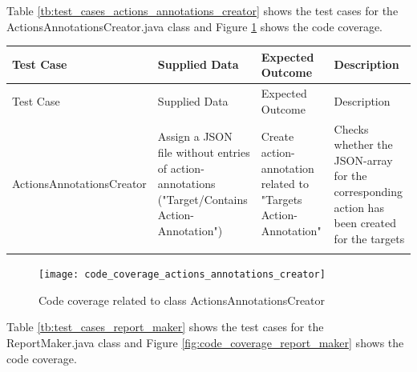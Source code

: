 Table \ref{tb:test_cases_actions_annotations_creator} shows the test cases for the ActionsAnnotationsCreator.java class and Figure \ref{fig:code_coverage_actions_annotations_creator} shows the code coverage.

\thispagestyle{empty}
	\begingroup
	\centering
	\scriptsize
	\renewcommand{\arraystretch}{1,5} 
	\keepXColumns
	\begin{tabularx}{\textwidth}{X  X  X  X}		
		\hline
		Test Case &Supplied Data&Expected Outcome&Description\\
		\hline\hline
		\endfirsthead
		\hline
		Test Case &Supplied Data&Expected Outcome&Description\\
		\hline\hline
		\endhead
		ActionsAnnotationsCreator&Assign a JSON file without entries of action-annotations ("Target/Contains Action-Annotation")&Create action-annotation related to "Targets Action-Annotation"&Checks whether the JSON-array for the corresponding action has been created for the targets\\
		
		
		\hline
		\caption{Test cases for ActionsAnnotationsCreator class}\label{tb:test_cases_actions_annotations_creator}
	\end{tabularx}		
	\endgroup
	
	\begin{figure}[h]
		\centering
		\texttt{[image: code\_coverage\_actions\_annotations\_creator]}
		\caption{Code coverage related to class ActionsAnnotationsCreator}\label{fig:code_coverage_actions_annotations_creator}
	\end{figure} 
	
Table \ref{tb:test_cases_report_maker} shows the test cases for the ReportMaker.java class and Figure \ref{fig:code_coverage_report_maker} shows the code coverage.

\begingroup
\centering
\scriptsize
\renewcommand{\arraystretch}{1,5} 
\keepXColumns

